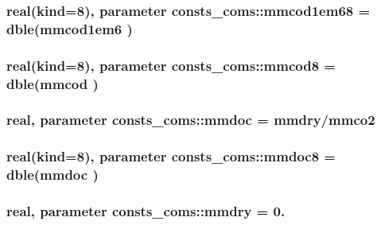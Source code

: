 \subsubsection[{\texorpdfstring{mmcod1em68}{mmcod1em68}}]{\setlength{\rightskip}{0pt plus 5cm}real(kind=8), parameter consts\+\_\+coms\+::mmcod1em68 = dble({\bf mmcod1em6} )}\hypertarget{namespaceconsts__coms_a22a9b2490e13490aeeeeaffa137cfc47}{}\label{namespaceconsts__coms_a22a9b2490e13490aeeeeaffa137cfc47}
\subsubsection[{\texorpdfstring{mmcod8}{mmcod8}}]{\setlength{\rightskip}{0pt plus 5cm}real(kind=8), parameter consts\+\_\+coms\+::mmcod8 = dble({\bf mmcod} )}\hypertarget{namespaceconsts__coms_aae7cdd0c3c7745c9fab0969b83f90eed}{}\label{namespaceconsts__coms_aae7cdd0c3c7745c9fab0969b83f90eed}
\subsubsection[{\texorpdfstring{mmdoc}{mmdoc}}]{\setlength{\rightskip}{0pt plus 5cm}real, parameter consts\+\_\+coms\+::mmdoc = {\bf mmdry}/{\bf mmco2}}\hypertarget{namespaceconsts__coms_a59bb453864e15b4a294a2569058fca9d}{}\label{namespaceconsts__coms_a59bb453864e15b4a294a2569058fca9d}
\subsubsection[{\texorpdfstring{mmdoc8}{mmdoc8}}]{\setlength{\rightskip}{0pt plus 5cm}real(kind=8), parameter consts\+\_\+coms\+::mmdoc8 = dble({\bf mmdoc} )}\hypertarget{namespaceconsts__coms_aaab14da3d986d797ca230301cd6b3826}{}\label{namespaceconsts__coms_aaab14da3d986d797ca230301cd6b3826}
\subsubsection[{\texorpdfstring{mmdry}{mmdry}}]{\setlength{\rightskip}{0pt plus 5cm}real, parameter consts\+\_\+coms\+::mmdry = 0.}\hypertarget{namespaceconsts__coms_a7aa35c23be3fddc9db2686245d45cda1}{}\label{namespaceconsts__coms_a7aa35c23be3fddc9db2686245d45cda1}
